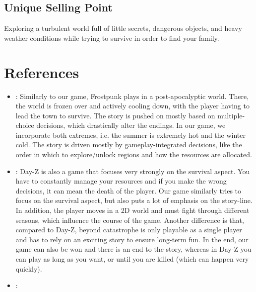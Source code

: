 \documentclass[a4paper]{scrreprt}
\begin{document}
\section{Unique Selling Point}
Exploring a turbulent world full of little secrets, dangerous objects, and
heavy weather conditions while trying to survive in order to find your family.



\chapter{References} 
\begin{itemize}
    \item \cite{frostpunk}:\newline
    Similarly to our game, Frostpunk plays in a post-apocalyptic world. There, the world is frozen over and actively cooling down, with the player having to lead the town to survive. The story is pushed on mostly based on multiple-choice decisions, which drastically alter the endings. In our game, we incorporate both extremes, i.e. the summer is extremely hot and the winter cold. The story is driven mostly by gameplay-integrated decisions, like the order in which to explore/unlock regions and how the resources are allocated.
    \item \cite{dayz}:\newline 
    Day-Z is also a game that focuses very strongly on the survival aspect. You have to constantly manage your resources and if you make the wrong decisions, it can mean the death of the player. Our game similarly tries to focus on the survival aspect, but also puts a lot of emphasis on the story-line. In addition, the player moves in a 2D world and must fight through different seasons, which influence the course of the game. Another difference is that, compared to Day-Z, beyond catastrophe is only playable as a single player and has to rely on an exciting story to ensure long-term fun. In the end, our game can also be won and there is an end to the story, whereas in Day-Z you can play as long as you want, or until you are killed (which can happen very quickly). 
    \item \cite{bindingofisaac}:\newline

\end{itemize}
\end{document}
